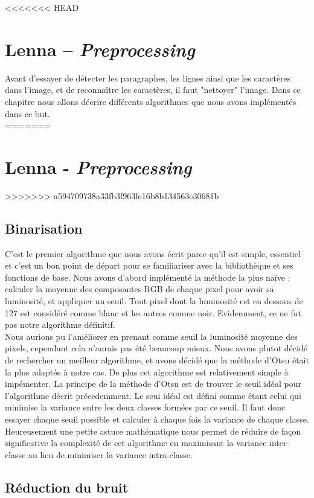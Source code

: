 <<<<<<< HEAD
\chapter{Lenna -- \emph{Preprocessing}}
Avant d'essayer de détecter les paragraphes, les lignes ainsi que les caractères dans l'image, et de reconnaître les caractères, il faut "nettoyer" l'image. Dans ce chapitre nous allons décrire différents algorithmes que nous avons implémentés dans ce but.\\
=======
\chapter{Lenna - \emph{Preprocessing}}
>>>>>>> a594709738a33fb3f963fe16b8b134563e30681b

\section{Binarisation}
C'est le premier algorithme que nous avons écrit parce qu'il est simple, essentiel et c'est un bon point de départ pour se familiariser avec la bibliothèque et ses fonctions de base. Nous avons d'abord implémenté la méthode la plus naïve : calculer la moyenne des composantes RGB de chaque pixel pour avoir sa luminosité, et appliquer un seuil. Tout pixel dont la luminosité est en dessous de 127 est considéré comme blanc et les autres comme noir. Evidemment, ce ne fut pas notre algorithme définitif.\\

Nous aurions pu l'améliorer en prenant comme seuil la luminosité moyenne des pixels, cependant cela n'aurais pas été beaucoup mieux. Nous avons plutot décidé de rechercher un meilleur algorithme, et avons décidé que la méthode d'Otsu était la plus adaptée à notre cas. De plus cet algorithme est relativement simple à impémenter. La principe de la méthode d'Otsu est de trouver le seuil idéal pour l'algorithme décrit précedemment. Le seui idéal est défini comme étant celui qui minimise la variance entre les deux classes formées par ce seuil. Il faut donc essayer chaque seuil possible et calculer à chaque fois la variance de chaque classe. Heureusement une petite astuce mathématique nous permet de réduire de façon significative la complexité de cet algorithme en maximisant la variance inter-classe au lieu de minimiser la variance intra-classe.\\

\section{Réduction du bruit}

